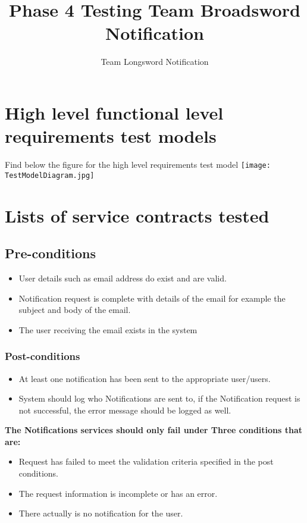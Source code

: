 \documentclass[11pt]{article}
\author{Team Longsword Notification}
\title{Phase 4 Testing Team Broadsword Notification}
\begin{document}
	\setlength{\parskip}{6pt}
	
	
	
	\tableofcontents
	
	\newpage
	
\section{High level functional level requirements test models}
		\begin{center}
			Find below the figure for the high level requirements test model
			\texttt{[image: TestModelDiagram.jpg]}\\[1cm]  
		\end{center}
\section{Lists of service contracts tested}
	\subsection{Pre-conditions}
	\begin{itemize}
		\item User details such as email address do exist and are valid.
		\item Notification request is complete with details of the email for example the subject and body of the email.
		\item The user receiving the email exists in the system
	\end{itemize}
	\subsubsection{Post-conditions}
	\begin{itemize}
		\item At least one notification has been sent to the appropriate user/users.
		\item System should log who Notifications are sent to, if the Notification request is not successful, the error message should be logged as well.
	\end{itemize}
	\textbf{The Notifications services should only fail under Three conditions that are:}
	\begin{itemize}
		\item Request has failed to meet the validation criteria specified in the post conditions.
		\item The request information is incomplete or has an error.
		\item There actually is no notification for the user.
	\end{itemize}
\end{document}
